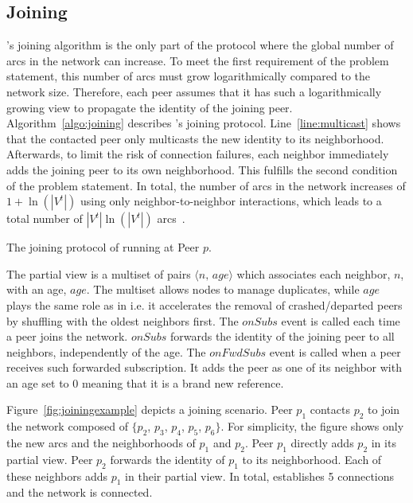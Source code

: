 \subsection{Joining}
\label{subsec:joining}

\SPRAY's joining algorithm is the only part of the protocol where the
global number of arcs in the network can increase. To meet the first
requirement of the problem statement, this number of arcs must grow
logarithmically compared to the network size. 
Therefore, each peer assumes that it has such a logarithmically
growing view to propagate the identity of the joining
peer. Algorithm~\ref{algo:joining} describes \SPRAY's joining
protocol. Line~\ref{line:multicast} shows that the contacted peer only
multicasts the new identity to its neighborhood. Afterwards, to limit
the risk of connection failures, each neighbor immediately adds the
joining peer to its own neighborhood. This fulfills the second
condition of the problem statement.  In total, the number of arcs in
the network increases of $1+\ln(|V^t|)$ using only
neighbor-to-neighbor interactions, which leads to a total number of
$|V^t|\ln(|V^t|)$ arcs~\cite{ganesh2001scamp}.

\begin{algorithm}[h]

\caption{\label{algo:joining}The joining protocol of \SPRAY running at Peer $p$.}
\end{algorithm}

The partial view is a multiset of pairs $\langle n,\, age\rangle$
which associates each neighbor, $n$, with an age, $age$. The multiset
allows nodes to manage duplicates, while $age$ plays the same role as
in \CYCLON i.e.  it accelerates the removal of crashed/departed peers
by shuffling with the oldest neighbors first. The $onSubs$ event is
called each time a peer joins the network. $onSubs$ forwards the
identity of the joining peer to all neighbors, independently of the
age. The $onFwdSubs$ event is called when a peer receives such
forwarded subscription. It adds the peer as one of its neighbor with
an age set to $0$ meaning that it is a brand new reference.



Figure~\ref{fig:joiningexample} depicts a joining scenario.  Peer
$p_1$ contacts $p_2$ to join the network composed of $\{p_2$, $p_3$,
$p_4$, $p_5$, $p_6\}$. For simplicity, the figure shows only the new
arcs and the neighborhoods of $p_1$ and $p_2$. Peer $p_1$ directly adds
$p_2$ in its partial view. Peer $p_2$ forwards the identity of $p_1$
to its neighborhood. Each of these neighbors adds $p_1$ in their
partial view. In total, \SPRAY establishes 5 connections and the
network is connected.

